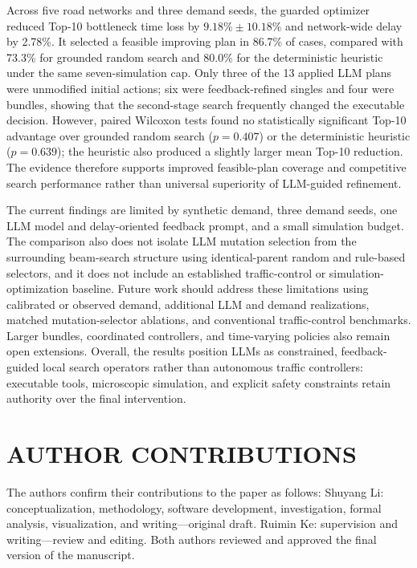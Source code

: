 \documentclass{trbunofficial}
\begin{document}
Across five road networks and three demand seeds, the guarded optimizer reduced
Top-10 bottleneck time loss by $9.18\%\pm10.18\%$ and network-wide delay by
2.78\%.  It selected a feasible improving plan in 86.7\% of cases, compared
with 73.3\% for grounded random search and 80.0\% for the deterministic
heuristic under the same seven-simulation cap.  Only three of the 13 applied
LLM plans were unmodified initial actions; six were feedback-refined singles
and four were bundles, showing that the second-stage search frequently changed
the executable decision.  However, paired Wilcoxon tests found no statistically
significant Top-10 advantage over grounded random search ($p=0.407$) or the
deterministic heuristic ($p=0.639$); the heuristic also produced a slightly
larger mean Top-10 reduction.  The evidence therefore supports improved
feasible-plan coverage and competitive search performance rather than universal
superiority of LLM-guided refinement.

The current findings are limited by synthetic demand, three demand seeds, one
LLM model and delay-oriented feedback prompt, and a small simulation budget.
The comparison also does not isolate LLM mutation selection from the surrounding
beam-search structure using identical-parent random and rule-based selectors,
and it does not include an established traffic-control or simulation-optimization
baseline.  Future work should address these limitations using calibrated or
observed demand, additional LLM and demand realizations, matched mutation-selector
ablations, and conventional traffic-control benchmarks.  Larger bundles,
coordinated controllers, and time-varying policies also remain open extensions.
Overall, the results position LLMs as constrained, feedback-guided local search
operators rather than autonomous traffic controllers: executable tools,
microscopic simulation, and explicit safety constraints retain authority over
the final intervention.


\section*{AUTHOR CONTRIBUTIONS}
The authors confirm their contributions to the paper as follows: Shuyang Li:
conceptualization, methodology, software development, investigation, formal
analysis, visualization, and writing---original draft. Ruimin Ke: supervision
and writing---review and editing. Both authors reviewed and approved the final
version of the manuscript.
\end{document}
